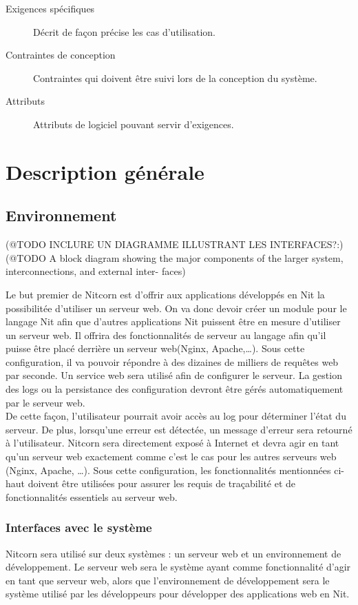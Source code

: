 \documentclass{scrreprt}
\begin{document}
\begin{description}
\item[Exigences spécifiques] Décrit de façon précise les cas d'utilisation.
\item[Contraintes de conception] Contraintes qui doivent être suivi lors de la conception du système.
\item[Attributs] Attributs de logiciel pouvant servir d'exigences. 
\end{description}
\chapter{Description générale}
\section{Environnement}
(@TODO INCLURE UN DIAGRAMME ILLUSTRANT LES INTERFACES?:)\\
(@TODO A block diagram showing the major components of the larger system, interconnections, and external inter-
faces)

Le but premier de Nitcorn est d'offrir aux applications développés en Nit la possibilitée
d'utiliser un serveur web. On va donc devoir créer un module pour le langage Nit afin que d'autres applications Nit puissent être en mesure d'utiliser un serveur web. Il offrira des fonctionnalités de serveur au langage afin qu'il puisse être placé derrière un serveur web(Nginx, Apache,\ldots). Sous cette configuration, il va pouvoir répondre à des dizaines de milliers de requêtes web par seconde. Un service web sera utilisé afin de configurer le serveur. La gestion des logs ou la persistance des configuration devront être gérés automatiquement par le serveur web.\\ De cette façon, l'utilisateur pourrait avoir accès au log pour déterminer l'état du serveur. De plus, lorsqu'une erreur est détectée, un message d'erreur sera retourné à l'utilisateur. Nitcorn sera directement exposé à Internet et devra agir en tant qu'un serveur web exactement comme c'est le cas pour les autres
serveurs web (Nginx, Apache, \ldots). Sous cette configuration, les
fonctionnalités mentionnées ci-haut doivent être utilisées pour assurer les requis de traçabilité
et de fonctionnalités essentiels au serveur web.

\subsection{Interfaces avec le système}
Nitcorn sera utilisé sur deux systèmes : un serveur web et un environnement de développement.
Le serveur web sera le système ayant comme fonctionnalité d'agir en tant que serveur web, alors
que l'environnement de développement sera le système utilisé par les développeurs
pour développer des applications web en Nit.
\end{document}
